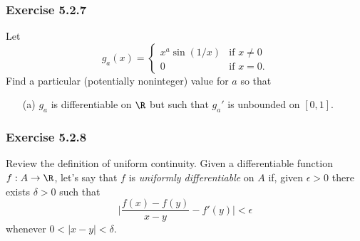 \subsubsection{Exercise 5.2.7} Let 
\[  g_a(x) = 
\begin{cases}
    x^a \sin(1/x) &\text{if } x \neq 0 \\
    0 &\text{if } x = 0. 
\end{cases} \]
Find a particular (potentially noninteger) value for \( a \) so that
\begin{enumerate}
    \item[(a)] \( g_a \) is differentiable on \( \R  \) but such that \( g_a' \) is unbounded on \( [0,1] \).
\end{enumerate}


\subsubsection{Exercise 5.2.8} Review the definition of uniform continuity. Given a differentiable function \( f: A \to \R  \), let's say that \( f  \) is \textit{uniformly differentiable} on \( A  \) if, given \( \epsilon > 0  \) there exists \( \delta > 0  \) such that 
\[\Big| \frac{ f(x) - f(y)  }{ x - y  } - f'(y) \Big| < \epsilon   \] whenever \(  0 < | x - y  |  < \delta  \).
